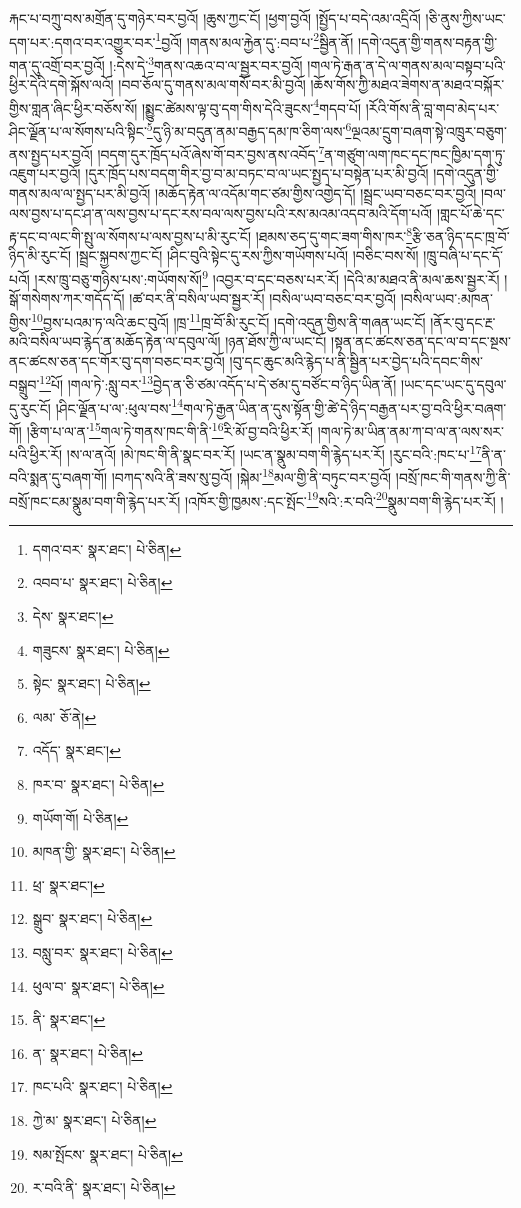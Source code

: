 རྐང་པ་བཀྲུ་བས་མགྲོན་དུ་གཉེར་བར་བྱའོ། །ཆུས་ཀྱང་ངོ། །ཕྱག་བྱའོ། །སྤྱོད་པ་བདེ་འམ་འདྲིའོ། །ཅི་ནུས་ཀྱིས་ཡང་དག་པར་:དགའ་བར་འགྱུར་བར་\footnote{དགའ་བར་  སྣར་ཐང་།  པེ་ཅིན། }བྱའོ། །གནས་མལ་རྐྱེན་དུ་:བབ་པ་\footnote{འབབ་པ་  སྣར་ཐང་།  པེ་ཅིན། }སྦྱིན་ནོ། །དགེ་འདུན་གྱི་གནས་བརྟན་གྱི་གན་དུ་འགྲོ་བར་བྱའོ། །:དེས་དེ་\footnote{དེས་  སྣར་ཐང་། }གནས་འཆའ་བ་ལ་སྦྱར་བར་བྱའོ། །གལ་ཏེ་རྒན་ན་དེ་ལ་གནས་མལ་བསྟབ་པའི་ཕྱིར་དེའི་དགེ་སྐོས་ལའོ། །བབ་ཅོལ་དུ་གནས་མལ་གསོ་བར་མི་བྱའོ། །ཆོས་གོས་ཀྱི་མཐའ་ཟེགས་ན་མཐའ་བསྐོར་གྱིས་གླན་ཞིང་ཕྱིར་བཅོས་སོ། །སྨྱུང་ཚེམས་ལྟ་བུ་དག་གིས་དེའི་ཟུངས་\footnote{གཟུངས་  སྣར་ཐང་།  པེ་ཅིན། }གདབ་པོ། །རོའི་གོས་ནི་བླ་གབ་མེད་པར་ཤིང་ལྗོན་པ་ལ་སོགས་པའི་སྟིང་\footnote{སྟེང་  སྣར་ཐང་།  པེ་ཅིན། }དུ་ཉི་མ་བདུན་ནམ་བརྒྱད་དམ་ཁ་ཅིག་ལས་\footnote{ལམ་  ཅོ་ནེ། }ལྔའམ་དྲུག་བཞག་སྟེ་འཁྲུར་བཅུག་ནས་སྤྱད་པར་བྱའོ། །བདག་དུར་ཁྲོད་པའོ་ཞེས་གོ་བར་བྱས་ནས་འབོད་\footnote{འདོད་  སྣར་ཐང་། }ན་གཙུག་ལག་ཁང་དང་ཁང་ཁྱིམ་དག་ཏུ་འཇུག་པར་བྱའོ། །དུར་ཁྲོད་པས་བདག་གིར་བྱ་བ་མ་བཏང་བ་ལ་ཡང་སྤྱད་པ་བསྟེན་པར་མི་བྱའོ། །དགེ་འདུན་གྱི་གནས་མལ་ལ་སྤྱད་པར་མི་བྱའོ། །མཆོད་རྟེན་ལ་འདོམ་གང་ཙམ་གྱིས་འགྱེད་དོ། །སྦྲང་ཡབ་བཅང་བར་བྱའོ། །བལ་ལས་བྱས་པ་དང་ཤ་ན་ལས་བྱས་པ་དང་རས་བལ་ལས་བྱས་པའི་རས་མའམ་འདབ་མའི་དོག་པའོ། །གླང་པོ་ཆེ་དང་རྟ་དང་བ་ལང་གི་སྤུ་ལ་སོགས་པ་ལས་བྱས་པ་མི་རུང་ངོ། །ཐམས་ཅད་དུ་གང་ཟག་གིས་ཁར་\footnote{ཁར་བ་  སྣར་ཐང་།  པེ་ཅིན། }རྩི་ཅན་ཉིད་དང་ཁྲ་བོ་ཉིད་མི་རུང་ངོ། །སྦྲང་སྐྱབས་ཀྱང་ངོ། །ཤིང་བུའི་སྟེང་དུ་རས་ཀྱིས་གཡོགས་པའོ། །བཅིང་བས་སོ། །ཁྲུ་བཞི་པ་དང་དོ་པའོ། །རས་ཁྲུ་བཅུ་གཉིས་པས་:གཡོགས་སོ།\footnote{གཡོག་གོ།  པེ་ཅིན། } །འབྱར་བ་དང་བཅས་པར་རོ། །དེའི་མ་མཐའ་ནི་མལ་ཆས་སྦྱར་རོ། །སྒོ་གསེགས་ཀར་གདོད་དོ། །ཚ་བར་ནི་བསིལ་ཡབ་སྦྱར་རོ། །བསིལ་ཡབ་བཅང་བར་བྱའོ། །བསིལ་ཡབ་:མཁན་གྱིས་\footnote{མཁན་གྱི་  སྣར་ཐང་།  པེ་ཅིན། }བྱས་པའམ་ཏ་ལའི་ཆང་བུའོ། །ཁྲ་\footnote{ཕྲ་  སྣར་ཐང་། }ཁྲ་བོ་མི་རུང་ངོ། །དགེ་འདུན་གྱིས་ནི་གཞན་ཡང་ངོ། །ནོར་བུ་དང་རྔ་མའི་བསིལ་ཡབ་རྙེད་ན་མཆོད་རྟེན་ལ་དབུལ་ལོ། །ཉན་ཐོས་ཀྱི་ལ་ཡང་ངོ། །སྟན་ནང་ཚངས་ཅན་དང་ལ་བ་དང་སྔས་ནང་ཚངས་ཅན་དང་གོར་བུ་དག་བཅང་བར་བྱའོ། །བུ་དང་ཆུང་མའི་རྙེད་པ་ནི་སྦྱིན་པར་བྱེད་པའི་དབང་གིས་བསྒྲུབ་\footnote{སྒྲུབ་  སྣར་ཐང་།  པེ་ཅིན། }པོ། །གལ་ཏེ་:སླུ་བར་\footnote{བསླུ་བར་  སྣར་ཐང་།  པེ་ཅིན། }བྱེད་ན་ཅི་ཙམ་འདོད་པ་དེ་ཙམ་དུ་བཙོང་བ་ཉིད་ཡིན་ནོ། །ཡང་དང་ཡང་དུ་དབུལ་དུ་རུང་ངོ། །ཤིང་ལྗོན་པ་ལ་:ཕུལ་བས་\footnote{ཕུལ་བ་  སྣར་ཐང་།  པེ་ཅིན། }གལ་ཏེ་རྒྱན་ཡིན་ན་དུས་སྟོན་གྱི་ཚེ་དེ་ཉིད་བརྒྱན་པར་བྱ་བའི་ཕྱིར་བཞག་གོ། །རྩིག་པ་ལ་ན་\footnote{ནི་  སྣར་ཐང་། }གལ་ཏེ་གནས་ཁང་གི་ནི་\footnote{ན་  སྣར་ཐང་།  པེ་ཅིན། }རི་མོ་བྱ་བའི་ཕྱིར་རོ། །གལ་ཏེ་མ་ཡིན་ནམ་ཀ་བ་ལ་ན་ལས་སར་པའི་ཕྱིར་རོ། །ས་ལ་ནའོ། །མེ་ཁང་གི་ནི་སྣང་བར་རོ། །ཡང་ན་སྣུམ་བག་གི་རྙེད་པར་རོ། །རུང་བའི་:ཁང་པ་\footnote{ཁང་པའི་  སྣར་ཐང་།  པེ་ཅིན། }ནི་ན་བའི་སྨན་དུ་བཞག་གོ། །བཀད་སའི་ནི་ཟས་སུ་བྱའོ། །སྐེམ་\footnote{ཀྱེ་མ་  སྣར་ཐང་།  པེ་ཅིན། }མལ་གྱི་ནི་བཏུང་བར་བྱའོ། །བསྲོ་ཁང་གི་གནས་ཀྱི་ནི་བསྲོ་ཁང་ངམ་སྣུམ་བག་གི་རྙེད་པར་རོ། །འཁོར་གྱི་ཁྱམས་:དང་སྤོང་\footnote{སམ་སྤོངས་  སྣར་ཐང་།  པེ་ཅིན། }སའི་:ར་བའི་\footnote{ར་བའི་ནི་  སྣར་ཐང་།  པེ་ཅིན། }སྣུམ་བག་གི་རྙེད་པར་རོ། །
